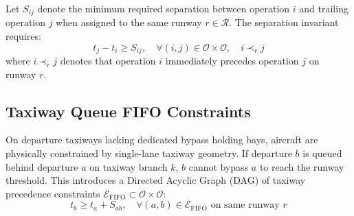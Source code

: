 \documentclass[10pt,journal,compsoc]{IEEEtran}
\begin{document}
Let $S_{ij}$ denote the minimum required separation between operation $i$ and trailing operation $j$ when assigned to the same runway $r \in \mathcal{R}$. The separation invariant requires:
\begin{equation}
t_j - t_i \ge S_{ij}, \quad \forall (i, j) \in \mathcal{O} \times \mathcal{O}, \quad i \prec_r j
\label{eq:sep_const}
\end{equation}
where $i \prec_r j$ denotes that operation $i$ immediately precedes operation $j$ on runway $r$.

\subsection{Taxiway Queue FIFO Constraints}
On departure taxiways lacking dedicated bypass holding bays, aircraft are physically constrained by single-lane taxiway geometry. If departure $b$ is queued behind departure $a$ on taxiway branch $k$, $b$ cannot bypass $a$ to reach the runway threshold. This introduces a Directed Acyclic Graph (DAG) of taxiway precedence constraints $\mathcal{E}_{\text{FIFO}} \subset \mathcal{O} \times \mathcal{O}$:
\begin{equation}
t_b \ge t_a + S_{ab}, \quad \forall (a, b) \in \mathcal{E}_{\text{FIFO}} \text{ on same runway } r
\label{eq:fifo_const}
\end{equation}
\end{document}
